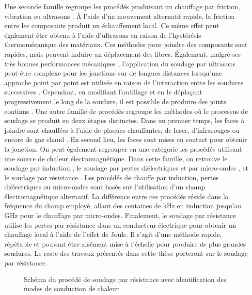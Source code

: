 \FloatBarrier
Une seconde famille regroupe les procédés produisant un chauffage par friction, vibration ou ultrasons \cite{Bates2007d,Levy2014}. 
À l'aide d'un mouvement alternatif rapide, la friction entre les composants produit un échauffement local. 
Ce même effet peut également être obtenu à l'aide d'ultrasons en raison de l'hystérésis thermomécanique des matériaux. 
Ces méthodes pour joindre des composants sont rapides, mais peuvent induire un déplacement des fibres. 
Également, malgré ses très bonnes performances mécaniques \cite{Villegas2016}, l'application du soudage par ultrasons peut être complexe pour les jonctions sur de longues distances lorsqu'une approche point par point est utilisée en raison de l'interaction entre les soudures successives \cite{Zhao2018}. 
Cependant, en modifiant l'outillage et en le déplaçant progressivement le long de la soudure, il est possible de produire des joints continus \cite{Engelschall2019}.
Une autre famille de procédés regroupe les méthodes où le processus de soudage se produit en deux étapes distinctes. 
Dans un premier temps, les faces à joindre sont chauffées à l'aide de plaques chauffantes, de laser, d'infrarouges ou encore de gaz chaud \cite{Yousefpour2004a,Johnson1989}. 
En second lieu, les faces sont mises en contact pour obtenir la jonction. 
On peut également regrouper en une catégorie les procédés utilisant une source de chaleur électromagnétique. 
Dans cette famille, on retrouve le soudage par induction \cite{Rudolf2000a,Ahmed2006a,Farahani2018}, le soudage  par pertes diélectriques et par micro-ondes \cite{Wu2012,Bowler2006a,Menendez2010d}, et le soudage par résistance \cite{houghton1984bonding,Eveno1988,Taylor1991,McKnight1997}. 
Les procédés de chauffe par induction, pertes diélectriques ou micro-ondes sont basés sur l'utilisation d'un champ électromagnétique alternatif. 
La différence entre ces procédés réside dans la fréquence du champ employé, allant des centaines de \si{\kilo\hertz} en induction jusqu'au \si{\giga\hertz} pour le chauffage par micro-ondes. 
Finalement, le soudage par résistance utilise les pertes par résistance dans un conducteur électrique pour obtenir un chauffage local à l'aide de l'effet de Joule. 
Il s'agit d'une méthode rapide, répétable et pouvant être aisément mise à l'échelle pour produire de plus grandes soudures. 
Le reste des travaux présentés dans cette thèse porteront sur le soudage par résistance. 

\begin{figure}[h]
	\centering
	
	\caption{Schéma du procédé de soudage par résistance avec identification des modes de conduction de chaleur}
	\label{fig:schema_soudage_resistance}
\end{figure}

